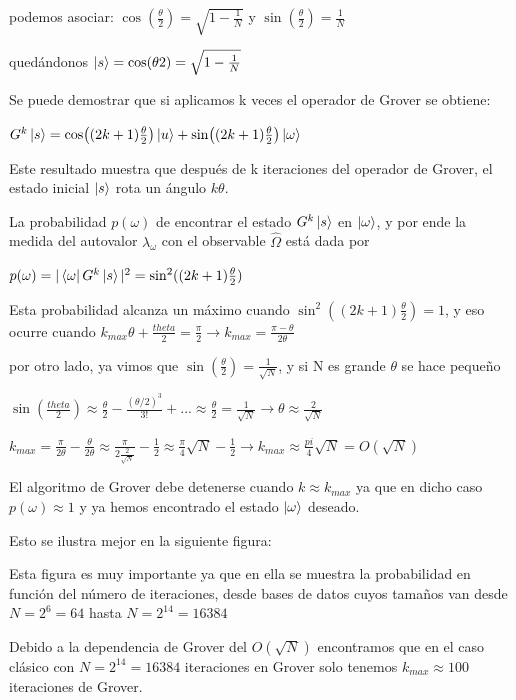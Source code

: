 \documentclass[11pt, spanish]{report}
\begin{document}
podemos asociar: $\cos(\frac{\theta}{2}) = \sqrt{1-\frac{1}{N}}$ y
$\sin(\frac{\theta}{2}) = \frac{1}{N}$

quedándonos $\ket{s} = \cos({\theta}{2}) = \sqrt{1-\frac{1}{N}}$

Se puede demostrar que si aplicamos k veces el operador de Grover se obtiene:

$G^k \ket{s} = \cos((2k+1)\frac{\theta}{2}) \ket{u} +
\sin((2k+1)\frac{\theta}{2}) \ket{\omega}$

Este resultado muestra que después de k iteraciones del operador de Grover, el
estado inicial $\ket{s}$ rota un ángulo $k\theta$.


La probabilidad $p(\omega)$ de encontrar el estado $G^k \ket{s}$ en
$\ket{\omega}$, y por ende la medida del autovalor $\lambda_\omega$ con el
observable $\hat{\Omega}$ está dada por

$p(\omega) = |\bra{\omega} G^k \ket{s}|^2 = \sin^2((2k+1)\frac{\theta}{2})$

Esta probabilidad alcanza un máximo cuando $\sin^2((2k+1)\frac{\theta}{2}) = 1$,
y eso ocurre cuando $k_{max} \theta + \frac{theta}{2} = \frac{\pi}{2}
\rightarrow k_{max} = \frac{\pi-\theta}{2\theta}$

por otro lado, ya vimos que $\sin(\frac{\theta}{2}) = \frac{1}{\sqrt{N}}$, y si
N es grande $\theta$ se hace pequeño

$\sin(\frac{theta}{2}) \approx \frac{\theta}{2} - \frac{(\theta/2)^3}{3!} + ...
\approx \frac{\theta}{2} = \frac{1}{\sqrt{N}} \rightarrow \theta \approx \frac{2}{\sqrt{N}}$

$k_{max} = \frac{\pi}{2\theta} - \frac{\theta}{2\theta} \approx \frac{\pi}{2
  \frac{2}{\sqrt{N}}} - \frac{1}{2} \approx \frac{\pi}{4} \sqrt{N} - \frac{1}{2}
\rightarrow k_{max} \approx \frac{pi}{4} \sqrt{N} = O(\sqrt{N})$

El algoritmo de Grover debe detenerse cuando $k \approx k_{max}$ ya que en dicho
caso $p(\omega) \approx 1$ y ya hemos encontrado el estado $\ket{\omega}$
deseado.

Esto se ilustra mejor en la siguiente figura:


Esta figura es muy importante ya que en ella se muestra la probabilidad en
función del número de iteraciones, desde bases de datos cuyos tamaños van desde
$N = 2^6 = 64$ hasta $N = 2^{14} = 16384$

Debido a la dependencia de Grover del $O(\sqrt{N})$ encontramos que en el caso
clásico con $N = 2^{14} = 16384$ iteraciones en Grover solo tenemos $k_{max}
\approx 100$ iteraciones de Grover.
\end{document}
